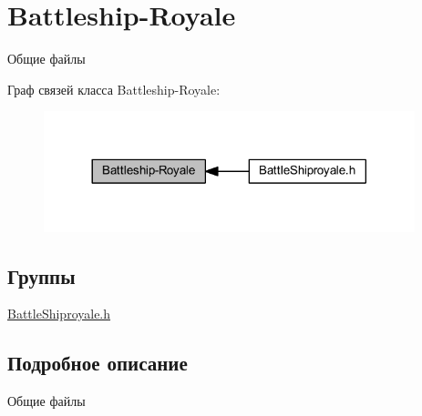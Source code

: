 \hypertarget{group__battleship-royale}{}\section{Battleship-\/\+Royale}
\label{group__battleship-royale}


Общие файлы  


Граф связей класса Battleship-\/\+Royale\+:\nopagebreak
\begin{figure}[H]
\begin{center}
\leavevmode
\includegraphics[width=305pt]{group__battleship-royale}
\end{center}
\end{figure}
\subsection*{Группы}
\begin{DoxyCompactItemize}
\item 
\mbox{\hyperlink{group__battleshiproyale}{Battle\+Shiproyale.\+h}}
\end{DoxyCompactItemize}


\subsection{Подробное описание}
Общие файлы 

